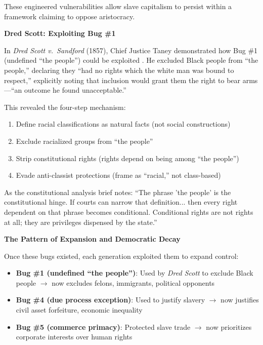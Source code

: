 \documentclass[12pt]{article}
\begin{document}
These engineered vulnerabilities allow slave capitalism to persist within a framework claiming to oppose aristocracy.

\textbf{Dred Scott: Exploiting Bug \#1}

In \textit{Dred Scott v.\ Sandford} (1857), Chief Justice Taney demonstrated how Bug \#1 (undefined ``the people'') could be exploited \cite{dredscott, fehrenbacher}. He excluded Black people from ``the people,'' declaring they ``had no rights which the white man was bound to respect,'' explicitly noting that inclusion would grant them the right to bear arms---``an outcome he found unacceptable.''

This revealed the four-step mechanism:
\begin{enumerate}
    \item Define racial classifications as natural facts (not social constructions)
    \item Exclude racialized groups from ``the people''
    \item Strip constitutional rights (rights depend on being among ``the people'')
    \item Evade anti-classist protections (frame as ``racial,'' not class-based)
\end{enumerate}

As the constitutional analysis brief notes: ``The phrase 'the people' is the constitutional hinge. If courts can narrow that definition... then every right dependent on that phrase becomes conditional. Conditional rights are not rights at all; they are privileges dispensed by the state.''

\textbf{The Pattern of Expansion and Democratic Decay}

Once these bugs existed, each generation exploited them to expand control:

\begin{itemize}
    \item \textbf{Bug \#1 (undefined ``the people'')}: Used by \textit{Dred Scott} to exclude Black people $\rightarrow$ now excludes felons, immigrants, political opponents
    \item \textbf{Bug \#4 (due process exception)}: Used to justify slavery $\rightarrow$ now justifies civil asset forfeiture, economic inequality
    \item \textbf{Bug \#5 (commerce primacy)}: Protected slave trade $\rightarrow$ now prioritizes corporate interests over human rights
\end{itemize}
\end{document}
